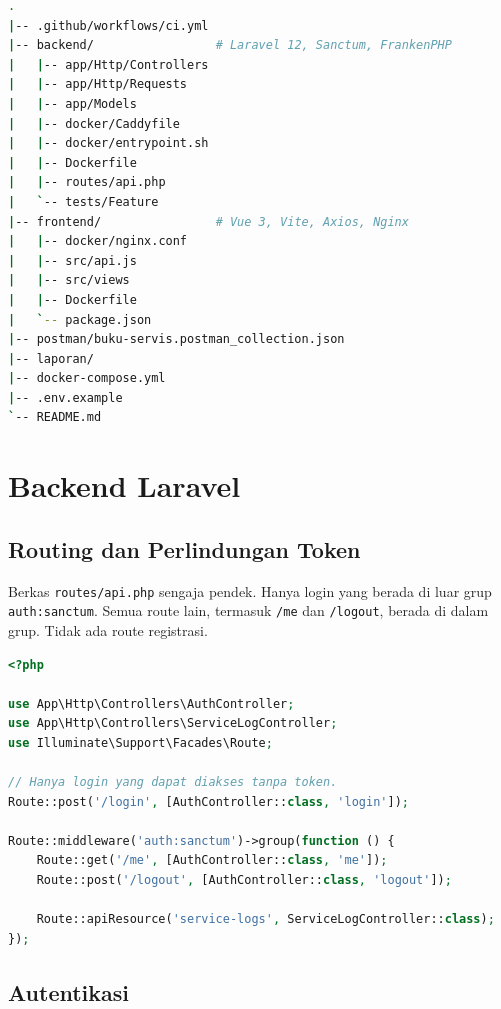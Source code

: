 \documentclass[12pt,a4paper,oneside]{book}
\begin{document}
\begin{lstlisting}[language=bash,caption={Struktur direktori utama repositori},label={kode:struktur}]
.
|-- .github/workflows/ci.yml
|-- backend/                 # Laravel 12, Sanctum, FrankenPHP
|   |-- app/Http/Controllers
|   |-- app/Http/Requests
|   |-- app/Models
|   |-- docker/Caddyfile
|   |-- docker/entrypoint.sh
|   |-- Dockerfile
|   |-- routes/api.php
|   `-- tests/Feature
|-- frontend/                # Vue 3, Vite, Axios, Nginx
|   |-- docker/nginx.conf
|   |-- src/api.js
|   |-- src/views
|   |-- Dockerfile
|   `-- package.json
|-- postman/buku-servis.postman_collection.json
|-- laporan/
|-- docker-compose.yml
|-- .env.example
`-- README.md
\end{lstlisting}

\section{Backend Laravel}

\subsection{Routing dan Perlindungan Token}

Berkas \texttt{routes/api.php} sengaja pendek. Hanya login yang berada di luar grup
\texttt{auth:sanctum}. Semua route lain, termasuk \texttt{/me} dan
\texttt{/logout}, berada di dalam grup. Tidak ada route registrasi.

\begin{lstlisting}[language=PHP,caption={Routing API di \texttt{backend/routes/api.php}},label={kode:routes}]
<?php

use App\Http\Controllers\AuthController;
use App\Http\Controllers\ServiceLogController;
use Illuminate\Support\Facades\Route;

// Hanya login yang dapat diakses tanpa token.
Route::post('/login', [AuthController::class, 'login']);

Route::middleware('auth:sanctum')->group(function () {
    Route::get('/me', [AuthController::class, 'me']);
    Route::post('/logout', [AuthController::class, 'logout']);

    Route::apiResource('service-logs', ServiceLogController::class);
});
\end{lstlisting}

\subsection{Autentikasi}
\end{document}

